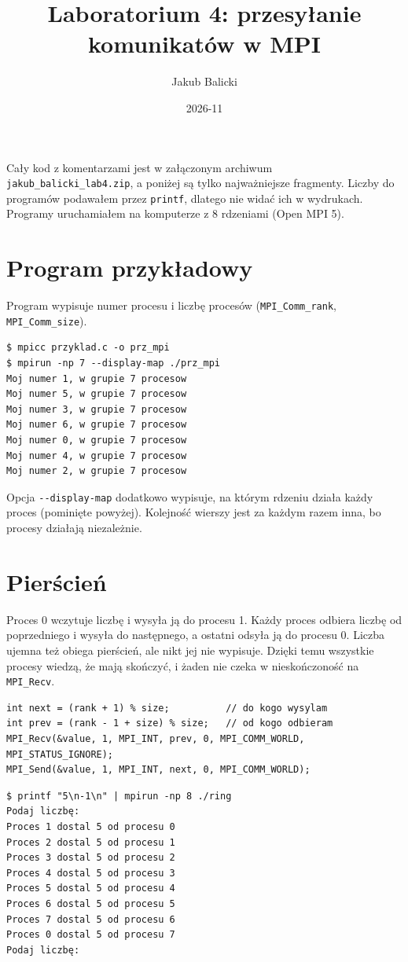 \documentclass[11pt,a4paper]{article}
\title{Laboratorium 4: przesyłanie komunikatów w MPI}
\author{Jakub Balicki}
\date{2026-11}
\begin{document}
\maketitle
\vspace{-1em}

Cały kod z komentarzami jest w załączonym archiwum \texttt{jakub\_balicki\_lab4.zip}, a poniżej są tylko najważniejsze fragmenty. Liczby do programów podawałem przez \texttt{printf}, dlatego nie widać ich w wydrukach. Programy uruchamiałem na komputerze z 8 rdzeniami (Open MPI 5).

\section{Program przykładowy}
Program wypisuje numer procesu i liczbę procesów (\texttt{MPI\_Comm\_rank}, \texttt{MPI\_Comm\_size}).
\begin{lstlisting}[style=plain]
$ mpicc przyklad.c -o prz_mpi
$ mpirun -np 7 --display-map ./prz_mpi
Moj numer 1, w grupie 7 procesow
Moj numer 5, w grupie 7 procesow
Moj numer 3, w grupie 7 procesow
Moj numer 6, w grupie 7 procesow
Moj numer 0, w grupie 7 procesow
Moj numer 4, w grupie 7 procesow
Moj numer 2, w grupie 7 procesow
\end{lstlisting}
Opcja \texttt{-{}-display-map} dodatkowo wypisuje, na którym rdzeniu działa każdy proces (pominięte powyżej). Kolejność wierszy jest za każdym razem inna, bo procesy działają niezależnie.

\section{Pierścień}
Proces 0 wczytuje liczbę i wysyła ją do procesu 1. Każdy proces odbiera liczbę od poprzedniego i wysyła do następnego, a ostatni odsyła ją do procesu 0. Liczba ujemna też obiega pierścień, ale nikt jej nie wypisuje. Dzięki temu wszystkie procesy wiedzą, że mają skończyć, i żaden nie czeka w nieskończoność na \texttt{MPI\_Recv}.
\begin{lstlisting}
int next = (rank + 1) % size;          // do kogo wysylam
int prev = (rank - 1 + size) % size;   // od kogo odbieram
MPI_Recv(&value, 1, MPI_INT, prev, 0, MPI_COMM_WORLD, MPI_STATUS_IGNORE);
MPI_Send(&value, 1, MPI_INT, next, 0, MPI_COMM_WORLD);
\end{lstlisting}
\begin{lstlisting}[style=plain]
$ printf "5\n-1\n" | mpirun -np 8 ./ring
Podaj liczbę:
Proces 1 dostal 5 od procesu 0
Proces 2 dostal 5 od procesu 1
Proces 3 dostal 5 od procesu 2
Proces 4 dostal 5 od procesu 3
Proces 5 dostal 5 od procesu 4
Proces 6 dostal 5 od procesu 5
Proces 7 dostal 5 od procesu 6
Proces 0 dostal 5 od procesu 7
Podaj liczbę:
\end{lstlisting}
\end{document}
